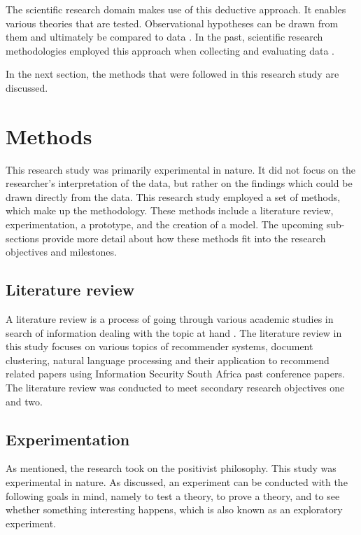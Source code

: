 The scientific research domain makes use of this deductive approach. It enables various theories that are tested. Observational hypotheses can be drawn from them and ultimately be compared to data \cite{bechtel2013philosophy}. In the past, scientific research methodologies employed this approach when collecting and evaluating data \cite{MARSDEN2018A1}.

In the next section, the methods that were followed in this research study are discussed.

\section{Methods} \label{ssec:meth}

This research study was primarily experimental in nature. It did not focus on the researcher’s interpretation of the data, but rather on the findings which could be drawn directly from the data. This research study employed a set of methods, which make up the methodology. These methods include a literature review, experimentation, a prototype, and the creation of a model. The upcoming sub-sections provide more detail about how these methods fit into the research objectives and milestones.

\subsection{Literature review} \label{ssec:prep}

A literature review is a process of going through various academic studies in search of information dealing with the topic at hand \cite{olivier2009information}. The literature review in this study focuses on various topics of recommender systems, document clustering, natural language processing and their application to recommend related papers using Information Security South Africa past conference papers. The literature review was conducted to meet secondary research objectives one and two.

\subsection{Experimentation} \label{ssec:exper}

As mentioned, the research took on the positivist philosophy. This study was experimental in nature. As  discussed, an experiment can be conducted with the following goals in mind, namely to test a theory, to prove a theory, and to see whether something interesting happens, which is also known as an exploratory experiment.

